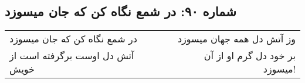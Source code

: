 \begin{center}
\section*{شماره ۹۰: در شمع نگاه کن که جان میسوزد}
\label{sec:090}
\begin{longtable}{l p{0.5cm} r}
در شمع نگاه کن که جان میسوزد
&&
وز آتش دل همه جهان میسوزد
\\
آتش دل اوست برگرفته است از خویش
&&
بر خود دل گرم او از آن میسوزد!
\\
\end{longtable}
\end{center}
